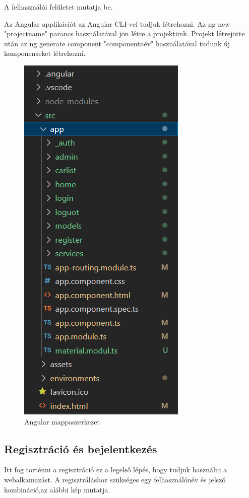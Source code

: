
A felhasználói felületet mutatja be.

Az Angular applikációt az Angular CLI-vel tudjuk létrehozni. Az ng new "projectname" parancs használatával jön létre a projektünk. Projekt létrejötte után az ng generate component "componentnév" használatával tudunk új komponenseket létrehozni.

\begin{figure}[h]
\centering
\includegraphics[scale=0.6]{images/angular_mappaszerkezet.png}
\caption{Angular mappaszerkezet}
\label{fig:mappaszerkezet}
\end{figure}
\newpage


\subsection{Regisztráció és bejelentkezés}
Itt fog történni a regisztráció ez a legelső lépés, hogy tudjuk használni a webalkamazást.
A regisztráláshoz szükséges egy felhasználónév és jelszó kombináció,az alábbi kép mutatja.

